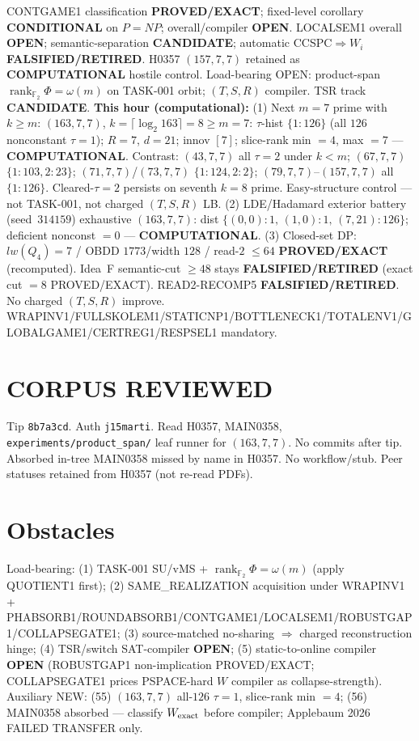 \documentclass[11pt]{article}
\begin{document}
CONTGAME1 classification \textbf{PROVED/EXACT}; fixed-level corollary \textbf{CONDITIONAL} on $P=NP$;
overall/compiler \textbf{OPEN}.
LOCALSEM1 overall \textbf{OPEN}; semantic-separation \textbf{CANDIDATE}; automatic CCSPC$\Rightarrow W_i$
\textbf{FALSIFIED/RETIRED}.
H0357 $(157,7,7)$ retained as \textbf{COMPUTATIONAL} hostile control.
Load-bearing OPEN: product-span $\operatorname{rank}_{\mathbb F_2}\Phi=\omega(m)$ on TASK-001 orbit;
$(T,S,R)$ compiler. TSR track \textbf{CANDIDATE}.
\textbf{This hour (computational):}
(1) Next $m{=}7$ prime with $k{\ge}m$: $(163,7,7)$, $k=\lceil\log_2 163\rceil=8{\ge}m{=}7$:
$\tau$-hist $\{1{:}126\}$ (all $126$ nonconstant $\tau{=}1$); $R{=}7$, $d{=}21$; innov $[7]$;
slice-rank min $=4$, max $=7$ --- \textbf{COMPUTATIONAL}.
Contrast: $(43,7,7)$ all $\tau{=}2$ under $k{<}m$; $(67,7,7)$ $\{1{:}103,2{:}23\}$;
$(71,7,7)$/$(73,7,7)$ $\{1{:}124,2{:}2\}$; $(79,7,7)$--$(157,7,7)$ all $\{1{:}126\}$.
Cleared-$\tau{=}2$ persists on seventh $k{=}8$ prime. Easy-structure control --- not TASK-001,
not charged $(T,S,R)$ LB.
(2) LDE/Hadamard exterior battery (seed~$314159$) exhaustive $(163,7,7)$:
dist $\{(0,0){:}1,\,(1,0){:}1,\,(7,21){:}126\}$; deficient nonconst $=0$ --- \textbf{COMPUTATIONAL}.
(3) Closed-set DP: $lw(Q_4)=7$ / OBDD $1773$/width $128$ / read-$2$ $\le64$
\textbf{PROVED/EXACT} (recomputed).
Idea~F semantic-cut $\ge48$ stays \textbf{FALSIFIED/RETIRED} (exact cut $=8$ PROVED/EXACT).
READ2-RECOMP5 \textbf{FALSIFIED/RETIRED}. No charged $(T,S,R)$ improve.
WRAPINV1/FULLSKOLEM1/STATICNP1/BOTTLENECK1/TOTALENV1/GLOBALGAME1/CERTREG1/RESPSEL1 mandatory.

\section*{CORPUS REVIEWED}
Tip \texttt{8b7a3cd}. Auth \texttt{j15marti}. Read H0357, MAIN0358,
\texttt{experiments/product\_span/} leaf runner for $(163,7,7)$.
No commits after tip. Absorbed in-tree MAIN0358 missed by name in H0357.
No workflow/stub. Peer statuses retained from H0357 (not re-read PDFs).

\section*{Obstacles}
Load-bearing: (1) TASK-001 SU/vMS + $\operatorname{rank}_{\mathbb F_2}\Phi=\omega(m)$ (apply QUOTIENT1 first);
(2) SAME\_REALIZATION acquisition under WRAPINV1 + PHABSORB1/ROUNDABSORB1/CONTGAME1/LOCALSEM1/ROBUSTGAP1/COLLAPSEGATE1;
(3) source-matched no-sharing $\Rightarrow$ charged reconstruction hinge;
(4) TSR/switch SAT-compiler \textbf{OPEN};
(5) static-to-online compiler \textbf{OPEN} (ROBUSTGAP1 non-implication PROVED/EXACT;
COLLAPSEGATE1 prices PSPACE-hard $W$ compiler as collapse-strength).
Auxiliary NEW: (55) $(163,7,7)$ all-$126$ $\tau{=}1$, slice-rank min $=4$;
(56) MAIN0358 absorbed --- classify $W_{\rm exact}$ before compiler; Applebaum 2026 FAILED TRANSFER only.
\end{document}
